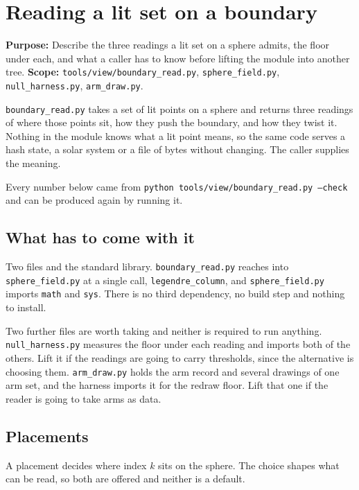 \chapter{Reading a lit set on a boundary}

\textbf{Purpose:} Describe the three readings a lit set on a sphere admits, the floor under each, and what a caller has to know before lifting the module into another tree. \textbf{Scope:} \texttt{tools/\allowbreak{}view/\allowbreak{}boundary\_read.py}, \texttt{sphere\_field.py}, \texttt{null\_harness.py}, \texttt{arm\_draw.py}.

\texttt{boundary\_read.py} takes a set of lit points on a sphere and returns three readings of where those points sit, how they push the boundary, and how they twist it. Nothing in the module knows what a lit point means, so the same code serves a hash state, a solar system or a file of bytes without changing. The caller supplies the meaning.

Every number below came from \texttt{python tools/view/boundary\_read.py --check} and can be produced again by running it.

\section{What has to come with it}

Two files and the standard library. \texttt{boundary\_read.py} reaches into \texttt{sphere\_field.py} at a single call, \texttt{legendre\_column}, and \texttt{sphere\_field.py} imports \texttt{math} and \texttt{sys}. There is no third dependency, no build step and nothing to install.

Two further files are worth taking and neither is required to run anything. \texttt{null\_harness.py} measures the floor under each reading and imports both of the others. Lift it if the readings are going to carry thresholds, since the alternative is choosing them. \texttt{arm\_draw.py} holds the arm record and several drawings of one arm set, and the harness imports it for the redraw floor. Lift that one if the reader is going to take arms as data.

\section{Placements}

A placement decides where index \(k\) sits on the sphere. The choice shapes what can be read, so both are offered and neither is a default.

